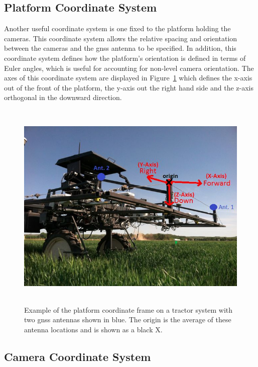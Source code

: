 \subsection{Platform Coordinate System}
\label{platform_coordinate_system}

Another useful coordinate system is one fixed to the platform holding the cameras.  This coordinate system allows the relative spacing and orientation between the cameras and the \ac{gnss} antenna to be specified.  In addition, this coordinate system defines how the platform's orientation is defined in terms of Euler angles, which is useful for accounting for non-level camera orientation.  The axes of this coordinate system are displayed in Figure~\ref{platform_frame} which defines the x-axis out of the front of the platform, the y-axis out the right hand side and the z-axis orthogonal in the downward direction.  

\begin{figure}
	\centering
    \includegraphics[height=4in]{figures/platform_frame_2_gps.jpg}
    \caption[Platform coordinate frame]{Example of the platform coordinate frame on a tractor system with two \ac{gnss} antennas shown in blue. The origin is the average of these antenna locations and is shown as a black X.}
    \label{platform_frame}
\end{figure}

\subsection{Camera Coordinate System}

